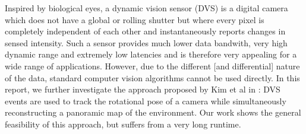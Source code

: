 Inspired by biological eyes, a dynamic vision sensor (DVS) is a digital camera
which does not have a global or rolling shutter but where every pixel is
completely independent of each other and instantaneously reports changes in
sensed intensity.
Such a sensor provides much lower data bandwith, very high dynamic range and
extremely low latencies and is therefore very appealing for a wide range of
applications. However, due to the different [and differential] nature of the
data, standard computer vision algorithms cannot be used directly.
In this report, we further investigate the approach proposed by Kim et al in
\cite{kim2014simultaneous}: DVS events are used to track the rotational pose of
a camera while simultaneously reconstructing a panoramic map of the
environment. Our work shows the general feasibility of this approach, but
suffers from a very long runtime.
